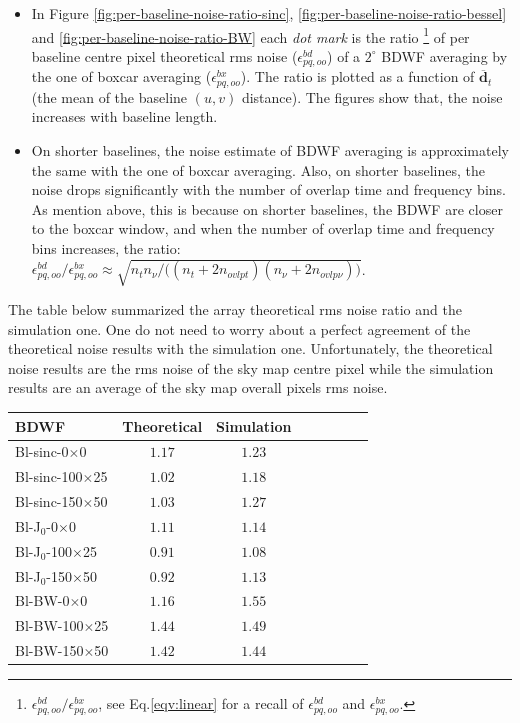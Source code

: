 \documentclass[useAMS,usenatbib]{mn2e}
\begin{document}
\begin{itemize}
 \item In Figure \ref{fig:per-baseline-noise-ratio-sinc}, \ref{fig:per-baseline-noise-ratio-bessel} 
and \ref{fig:per-baseline-noise-ratio-BW} each \textit{dot mark} is the ratio 
\footnote{$\epsilon^{bd}_{pq,oo}/\epsilon^{bx}_{pq,oo}$, see 
Eq.\ref{eqv:linear} for a recall of $\epsilon^{bd}_{pq,oo}$ and $\epsilon^{bx}_{pq,oo}$.} of per baseline centre pixel theoretical rms 
noise ($\epsilon^{bd}_{pq,oo}$) of a $2^\circ$ BDWF 
averaging  by the one of boxcar averaging ($\epsilon^{bx}_{pq,oo}$). The ratio is plotted as a function of 
$\overline{\mathbf{d}}_t$ (the mean of the baseline $(u,v)$ distance). The figures show that, the noise increases with baseline 
length.
   \item On shorter baselines, the noise estimate of BDWF averaging is approximately the same with the one 
of boxcar averaging. Also, on shorter baselines, the noise drops significantly with the number of  overlap time and frequency bins. As 
mention above, this is because on 
shorter  baselines, the BDWF are closer to the boxcar window, and when the number of overlap time  and 
frequency  bins increases, the ratio:
 $\epsilon^{bd}_{pq,oo}/\epsilon^{bx}_{pq,oo} \approx \sqrt{n_t n_{\nu}/\big((n_t + 2n_{ovlpt})(n_{\nu} + 
2n_{ovlp\nu})\big)}$.%
\end{itemize}
The table below summarized the array theoretical rms noise ratio and the simulation one. One do not need to worry about a perfect 
agreement of the theoretical noise results with the simulation one. Unfortunately, the theoretical noise results are the rms noise of the 
sky map centre pixel while the simulation results are an average of the sky map overall pixels rms noise.\\

\hspace{0.15cm}\begin{tabular}{l*{6}{c}r}
  \textbf{\footnotesize BDWF} &\textbf{\footnotesize Theoretical}&\textbf{\footnotesize Simulation}\\
  \hline\hline
  {\footnotesize Bl-sinc-0$\times$0} &{\footnotesize $1.17$} &{\footnotesize $1.23$}\\
  {\footnotesize Bl-sinc-100$\times$25} &{\footnotesize $1.02$} &{\footnotesize $1.18$}\\
  {\footnotesize Bl-sinc-150$\times$50} &{\footnotesize $1.03$} &{\footnotesize $1.27$}\\
  \hline
  {\footnotesize Bl-J$_0$-0$\times$0} &{\footnotesize  $1.11$}&{\footnotesize  $1.14$}\\
  {\footnotesize Bl-J$_0$-100$\times$25} &{\footnotesize  $0.91$}&{\footnotesize  $1.08$}\\
  {\footnotesize Bl-J$_0$-150$\times$50} &{\footnotesize  $0.92$}&{\footnotesize  $1.13$}\\
  \hline
  {\footnotesize Bl-BW-0$\times$0} & {\footnotesize $1.16$}&{\footnotesize  $1.55$}\\
  {\footnotesize Bl-BW-100$\times$25} & {\footnotesize $1.44$}&{\footnotesize  $1.49$}\\
  {\footnotesize Bl-BW-150$\times$50} & {\footnotesize $1.42$}&{\footnotesize  $1.44$}
\end{tabular}
\end{document}
